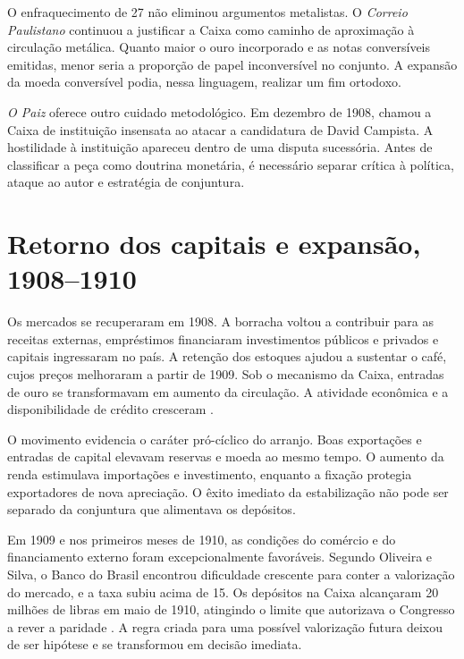 O enfraquecimento de 27 não eliminou argumentos metalistas. O \textit{Correio Paulistano} continuou a justificar a Caixa como caminho de aproximação à circulação metálica. Quanto maior o ouro incorporado e as notas conversíveis emitidas, menor seria a proporção de papel inconversível no conjunto. A expansão da moeda conversível podia, nessa linguagem, realizar um fim ortodoxo.


\textit{O Paiz} oferece outro cuidado metodológico. Em dezembro de 1908, chamou a Caixa de instituição insensata ao atacar a candidatura de David Campista. A hostilidade à instituição apareceu dentro de uma disputa sucessória. Antes de classificar a peça como doutrina monetária, é necessário separar crítica à política, ataque ao autor e estratégia de conjuntura.


\section{Retorno dos capitais e expansão, 1908--1910}

Os mercados se recuperaram em 1908. A borracha voltou a contribuir para as receitas externas, empréstimos financiaram investimentos públicos e privados e capitais ingressaram no país. A retenção dos estoques ajudou a sustentar o café, cujos preços melhoraram a partir de 1909. Sob o mecanismo da Caixa, entradas de ouro se transformavam em aumento da circulação. A atividade econômica e a disponibilidade de crédito cresceram \cite{fritsch1990,francolago2011}.

O movimento evidencia o caráter pró-cíclico do arranjo. Boas exportações e entradas de capital elevavam reservas e moeda ao mesmo tempo. O aumento da renda estimulava importações e investimento, enquanto a fixação protegia exportadores de nova apreciação. O êxito imediato da estabilização não pode ser separado da conjuntura que alimentava os depósitos.

Em 1909 e nos primeiros meses de 1910, as condições do comércio e do financiamento externo foram excepcionalmente favoráveis. Segundo Oliveira e Silva, o Banco do Brasil encontrou dificuldade crescente para conter a valorização do mercado, e a taxa subiu acima de 15. Os depósitos na Caixa alcançaram 20 milhões de libras em maio de 1910, atingindo o limite que autorizava o Congresso a rever a paridade \cite{oliveirasilva2001}. A regra criada para uma possível valorização futura deixou de ser hipótese e se transformou em decisão imediata.

